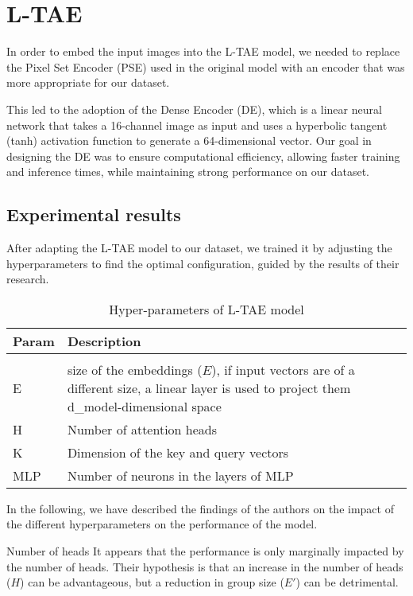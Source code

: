 \section{L-TAE}
In order to embed the input images into the L-TAE model, we needed to replace the Pixel Set Encoder (PSE) used in the original model with an encoder that was more appropriate for our dataset.

This led to the adoption of the Dense Encoder (DE), which is a linear neural network that takes a 16-channel image as input and uses a hyperbolic tangent (tanh) activation function to generate a 64-dimensional vector.
Our goal in designing the DE was to ensure computational efficiency, allowing faster training and inference times, while maintaining strong performance on our dataset.

\subsection{Experimental results}

After adapting the L-TAE model to our dataset, we trained it by adjusting the hyperparameters to find the optimal configuration, guided by the results of their research.

\begin{table}[ht]
  \centering
  \begin{tabular}{l p{10cm}}   
     Param & Description \\[0.2cm] 
     \hline \\[-0.2cm]  
     E & size of the embeddings ($E$), if input vectors are of a different size, a linear layer is used to project them d\_model-dimensional space \\
     H & Number of attention heads  \\
     K & Dimension of the key and query vectors  \\
     MLP & Number of neurons in the layers of MLP \\
  \end{tabular}
  \caption{Hyper-parameters of L-TAE model}
  \label{tab:LTAEconfig}
\end{table}

In the following, we have described the findings of the authors on the impact of the different hyperparameters on the performance of the model.

\begin{paragraph} {Number of heads} 
It appears that the performance is only marginally impacted by the number of heads. 
Their hypothesis is that an increase in the number of heads ($H$) can be advantageous, but a reduction in group size ($E'$) can be detrimental.
\end{paragraph}

